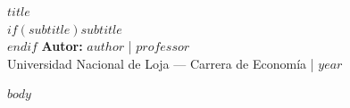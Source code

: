 \documentclass[$if(fontsize)$$fontsize$$else$12pt$endif$,spanish]{article}
\begin{document}

\begin{center}
    {\bfseries \Large $title$}\\[0.2cm]
    $if(subtitle)${\bfseries \large $subtitle$}\\[0.4cm]$endif$
    {\normalsize \bfseries Autor:} {\normalsize $author$} \quad |  {\normalsize $professor$}\\[0.1cm]
    {\small Universidad Nacional de Loja --- Carrera de Economía \quad | \quad $year$}\\[0.6cm]
\end{center}

$body$
\end{document}
